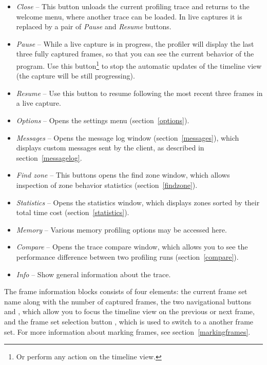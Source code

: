 \documentclass[hidelinks,titlepage,a4paper]{article}
\begin{document}
\begin{itemize}
\item \emph{\faPowerOff{} Close} -- This button unloads the current profiling trace and returns to the welcome menu, where another trace can be loaded. In live captures it is replaced by a pair of \emph{\faPause{} Pause} and \emph{\faPlay{} Resume} buttons.
\item \emph{\faPause{} Pause} -- While a live capture is in progress, the profiler will display the last three fully captured frames, so that you can see the current behavior of the program. Use this button\footnote{Or perform any action on the timeline view.} to stop the automatic updates of the timeline view (the capture will be still progressing).
\item \emph{\faPlay{} Resume} -- Use this button to resume following the most recent three frames in a live capture.
\item \emph{\faCog{} Options} -- Opens the settings menu (section~\ref{options}).
\item \emph{\faTags{} Messages} -- Opens the message log window (section~\ref{messages}), which displays custom messages sent by the client, as described in section~\ref{messagelog}.
\item \emph{\faSearch{} Find zone} -- This buttons opens the find zone window, which allows inspection of zone behavior statistics (section~\ref{findzone}).
\item \emph{\faSortAmountUp{} Statistics} -- Opens the statistics window, which displays zones sorted by their total time cost (section~\ref{statistics}).
\item \emph{\faMemory{} Memory} -- Various memory profiling options may be accessed here.
\item \emph{\faBalanceScale{} Compare} -- Opens the trace compare window, which allows you to see the performance difference between two profiling runs (section~\ref{compare}).
\item \emph{\faFingerprint{} Info} -- Show general information about the trace.
\end{itemize}

The frame information blocks consists of four elements: the current frame set name along with the number of captured frames, the two navigational buttons \faCaretLeft{} and \faCaretRight{}, which allow you to focus the timeline view on the previous or next frame, and the frame set selection button \faCaretDown{}, which is used to switch to a another frame set. For more information about marking frames, see section~\ref{markingframes}.
\end{document}
